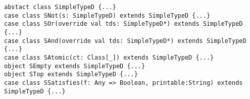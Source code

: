 
\begin{lstlisting}[style=reclojureScala]
abstact class SimpleTypeD {...}
case class SNot(s: SimpleTypeD) extends SimpleTypeD {...}
case class SOr(override val tds: SimpleTypeD*) extends SimpleTypeD {...}
case class SAnd(override val tds: SimpleTypeD*) extends SimpleTypeD {...}
case class SAtomic(ct: Class[_]) extends SimpleTypeD {...}
object SEmpty extends SimpleTypeD {...}
object STop extends SimpleTypeD {...}
case class SSatisfies(f: Any => Boolean, printable:String) extends SimpleTypeD {...}
\end{lstlisting}
